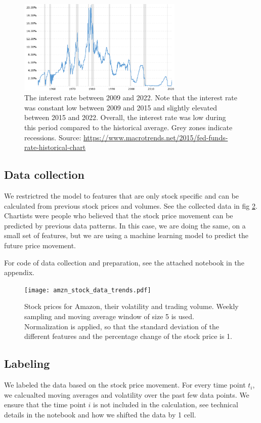 \documentclass{article}
\begin{document}
\begin{figure}[h]
    \centering
    \includegraphics[width=0.7\textwidth]{IR.png}
    \caption{The interest rate between 2009 and 2022. Note that
        the interest rate was constant low between 2009 and 2015
        and slightly elevated between 2015 and 2022. Overall,
        the interest rate was low during this period compared
        to the historical average. Grey zones indicate recessions.
        Source: \url{https://www.macrotrends.net/2015/fed-funds-rate-historical-chart}}
    \label{fig:interest}
\end{figure}


\subsection*{Data collection}
We restrictred the model to features that are only stock specific and can be calculated from
previous stock prices and volumes. See the collected data in fig \ref{fig:amazon_scaled_data}.
Chartists were people who believed that
the stock price movement can be predicted by previous data patterns.
In this case, we are doing the same, on a small set of features,
but we are using a machine learning model to predict the future price movement.

For code of data collection and preparation, see the attached notebook in the appendix.

\begin{figure}[ht]
    \centering
    \texttt{[image: amzn\_stock\_data\_trends.pdf]}
    \caption{Stock prices for Amazon, their volatility and trading volume.
        Weekly sampling and moving average window of size 5 is used.
        Normalization is applied, so that the standard deviation of the
        different features and the percentage change of the stock price
        is 1.}
    \label{fig:amazon_scaled_data}
\end{figure}

\subsection*{Labeling}
We labeled the data based on the stock price movement.
For every time point $t_i$,
we calcualted moving averages and volatility over the past few data points.
We ensure that the time point $i$ is not included in the calculation,
see technical details in the notebook and how we shifted the data by 1 cell.
\end{document}
